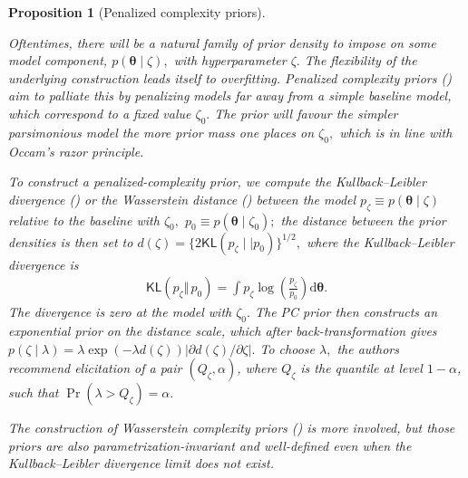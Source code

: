 \documentclass[
  11pt,
  letterpaper,
]{scrbook}
\theoremstyle{definition}
\theoremstyle{plain}
\newtheorem{proposition}{Proposition}[chapter]
\theoremstyle{plain}
\theoremstyle{plain}
\theoremstyle{definition}
\theoremstyle{definition}
\theoremstyle{plain}
\newtheorem{proposition}{Proposition}[chapter]
\theoremstyle{plain}
\theoremstyle{remark}
\begin{document}
\begin{proposition}[Penalized complexity
priors]\protect\hypertarget{prp-penalized-complexity}{}\label{prp-penalized-complexity}

Oftentimes, there will be a natural family of prior density to impose on
some model component, \(p(\boldsymbol{\theta} \mid \zeta),\) with
hyperparameter \(\zeta.\) The flexibility of the underlying construction
leads itself to overfitting. Penalized complexity priors
() aim to palliate this
by penalizing models far away from a simple baseline model, which
correspond to a fixed value \(\zeta_0.\) The prior will favour the
simpler parsimonious model the more prior mass one places on
\(\zeta_0,\) which is in line with Occam's razor principle.

To construct a penalized-complexity prior, we compute the
Kullback--Leibler divergence () or the Wasserstein distance () between the model
\(p_\zeta \equiv p(\boldsymbol{\theta} \mid \zeta)\) relative to the
baseline with \(\zeta_0,\) \(p_0 \equiv p(\boldsymbol{\theta} \mid
\zeta_0);\) the distance between the prior densities is then set to
\(d(\zeta) = \{2\mathsf{KL}(p_\zeta \mid\mid p_0)\}^{1/2},\) where the
Kullback--Leibler divergence is \begin{align*}
\mathsf{KL}(p_\zeta \Vert\, p_0)=\int p_\zeta \log\left(\frac{p_\zeta}{p_0}\right) \mathrm{d} \boldsymbol{\theta}.
\end{align*} The divergence is zero at the model with \(\zeta_0.\) The
PC prior then constructs an exponential prior on the distance scale,
which after back-transformation gives
\(p(\zeta \mid \lambda) = \lambda\exp(-\lambda d(\zeta)) \left| {\partial d(\zeta)}/{\partial \zeta}\right|.\)
To choose \(\lambda,\) the authors recommend elicitation of a pair
\((Q_\zeta, \alpha)\), where \(Q_\zeta\) is the quantile at level
\(1-\alpha\), such that \(\Pr(\lambda > Q_\zeta)=\alpha.\)

The construction of Wasserstein complexity priors
() is more involved, but
those priors are also parametrization-invariant and well-defined even
when the Kullback--Leibler divergence limit does not exist.

\end{proposition}
\end{document}

